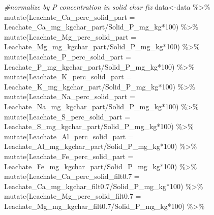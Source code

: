 \documentclass[
]{article}
\newenvironment{Shaded}{\begin{snugshade}}{\end{snugshade}}
\newcommand{\AttributeTok}[1]{\textcolor[rgb]{0.77,0.63,0.00}{#1}}
\newcommand{\CommentTok}[1]{\textcolor[rgb]{0.56,0.35,0.01}{\textit{#1}}}
\newcommand{\DecValTok}[1]{\textcolor[rgb]{0.00,0.00,0.81}{#1}}
\newcommand{\FloatTok}[1]{\textcolor[rgb]{0.00,0.00,0.81}{#1}}
\newcommand{\FunctionTok}[1]{\textcolor[rgb]{0.00,0.00,0.00}{#1}}
\newcommand{\NormalTok}[1]{#1}
\newcommand{\OtherTok}[1]{\textcolor[rgb]{0.56,0.35,0.01}{#1}}
\newcommand{\SpecialCharTok}[1]{\textcolor[rgb]{0.00,0.00,0.00}{#1}}
\begin{document}
\begin{Shaded}
\begin{Highlighting}[]
\CommentTok{\#normalize by P concentration in solid char fix}
\NormalTok{data}\OtherTok{\textless{}{-}}\NormalTok{data }\SpecialCharTok{\%\textgreater{}\%}
  \FunctionTok{mutate}\NormalTok{(}\AttributeTok{Leachate\_Ca\_perc\_solid\_part =}\NormalTok{ Leachate\_Ca\_mg\_kgchar\_part}\SpecialCharTok{/}\NormalTok{Solid\_P\_mg\_kg}\SpecialCharTok{*}\DecValTok{100}\NormalTok{) }\SpecialCharTok{\%\textgreater{}\%}
  \FunctionTok{mutate}\NormalTok{(}\AttributeTok{Leachate\_Mg\_perc\_solid\_part =}\NormalTok{ Leachate\_Mg\_mg\_kgchar\_part}\SpecialCharTok{/}\NormalTok{Solid\_P\_mg\_kg}\SpecialCharTok{*}\DecValTok{100}\NormalTok{) }\SpecialCharTok{\%\textgreater{}\%}
  \FunctionTok{mutate}\NormalTok{(}\AttributeTok{Leachate\_P\_perc\_solid\_part =}\NormalTok{ Leachate\_P\_mg\_kgchar\_part}\SpecialCharTok{/}\NormalTok{Solid\_P\_mg\_kg}\SpecialCharTok{*}\DecValTok{100}\NormalTok{) }\SpecialCharTok{\%\textgreater{}\%}
  \FunctionTok{mutate}\NormalTok{(}\AttributeTok{Leachate\_K\_perc\_solid\_part =}\NormalTok{ Leachate\_K\_mg\_kgchar\_part}\SpecialCharTok{/}\NormalTok{Solid\_P\_mg\_kg}\SpecialCharTok{*}\DecValTok{100}\NormalTok{) }\SpecialCharTok{\%\textgreater{}\%}
  \FunctionTok{mutate}\NormalTok{(}\AttributeTok{Leachate\_Na\_perc\_solid\_part =}\NormalTok{ Leachate\_Na\_mg\_kgchar\_part}\SpecialCharTok{/}\NormalTok{Solid\_P\_mg\_kg}\SpecialCharTok{*}\DecValTok{100}\NormalTok{) }\SpecialCharTok{\%\textgreater{}\%}
  \FunctionTok{mutate}\NormalTok{(}\AttributeTok{Leachate\_S\_perc\_solid\_part =}\NormalTok{ Leachate\_S\_mg\_kgchar\_part}\SpecialCharTok{/}\NormalTok{Solid\_P\_mg\_kg}\SpecialCharTok{*}\DecValTok{100}\NormalTok{) }\SpecialCharTok{\%\textgreater{}\%}
  \FunctionTok{mutate}\NormalTok{(}\AttributeTok{Leachate\_Al\_perc\_solid\_part =}\NormalTok{ Leachate\_Al\_mg\_kgchar\_part}\SpecialCharTok{/}\NormalTok{Solid\_P\_mg\_kg}\SpecialCharTok{*}\DecValTok{100}\NormalTok{) }\SpecialCharTok{\%\textgreater{}\%}
  \FunctionTok{mutate}\NormalTok{(}\AttributeTok{Leachate\_Fe\_perc\_solid\_part =}\NormalTok{ Leachate\_Fe\_mg\_kgchar\_part}\SpecialCharTok{/}\NormalTok{Solid\_P\_mg\_kg}\SpecialCharTok{*}\DecValTok{100}\NormalTok{) }\SpecialCharTok{\%\textgreater{}\%}
  \FunctionTok{mutate}\NormalTok{(}\AttributeTok{Leachate\_Ca\_perc\_solid\_filt0.7 =}\NormalTok{ Leachate\_Ca\_mg\_kgchar\_filt0}\FloatTok{.7}\SpecialCharTok{/}\NormalTok{Solid\_P\_mg\_kg}\SpecialCharTok{*}\DecValTok{100}\NormalTok{) }\SpecialCharTok{\%\textgreater{}\%}
  \FunctionTok{mutate}\NormalTok{(}\AttributeTok{Leachate\_Mg\_perc\_solid\_filt0.7 =}\NormalTok{ Leachate\_Mg\_mg\_kgchar\_filt0}\FloatTok{.7}\SpecialCharTok{/}\NormalTok{Solid\_P\_mg\_kg}\SpecialCharTok{*}\DecValTok{100}\NormalTok{) }\SpecialCharTok{\%\textgreater{}\%}

\end{Highlighting}
\end{Shaded}
\end{document}
